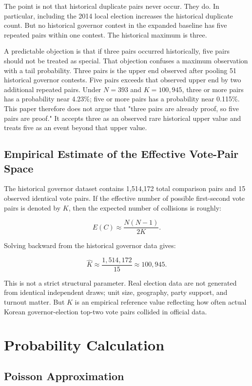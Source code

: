 \documentclass[preprint]{../ieie/IEIE}
\begin{document}
The point is not that historical duplicate pairs never occur. They do. In particular, including the 2014 local election increases the historical duplicate count. But no historical governor contest in the expanded baseline has five repeated pairs within one contest. The historical maximum is three.

A predictable objection is that if three pairs occurred historically, five pairs should not be treated as special. That objection confuses a maximum observation with a tail probability. Three pairs is the upper end observed after pooling 51 historical governor contests. Five pairs exceeds that observed upper end by two additional repeated pairs. Under \(N=393\) and \(K=100,945\), three or more pairs has a probability near 4.23\%; five or more pairs has a probability near 0.115\%. This paper therefore does not argue that "three pairs are already proof, so five pairs are proof." It accepts three as an observed rare historical upper value and treats five as an event beyond that upper value.

\subsection{Empirical Estimate of the Effective Vote-Pair Space}

The historical governor dataset contains 1,514,172 total comparison pairs and 15 observed identical vote pairs. If the effective number of possible first-second vote pairs is denoted by \(K\), then the expected number of collisions is roughly:

\[
E(C) \approx \frac{N(N-1)}{2K}.
\]

Solving backward from the historical governor data gives:

\[
\hat{K} \approx \frac{1,514,172}{15} \approx 100,945.
\]

This is not a strict structural parameter. Real election data are not generated from identical independent draws; unit size, geography, party support, and turnout matter. But \(K\) is an empirical reference value reflecting how often actual Korean governor-election top-two vote pairs collided in official data.

\section{Probability Calculation}

\subsection{Poisson Approximation}
\end{document}
